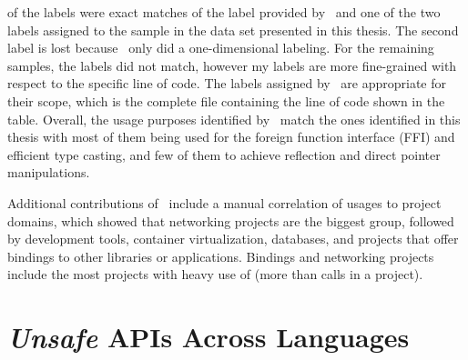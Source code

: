 

 of the labels were exact matches of the label provided by~\cite{costa2020} and one of the two labels
assigned to the sample in the data set presented in this thesis.
The second label is lost because~\cite{costa2020} only did a one-dimensional labeling.
For the remaining  samples, the labels did not match, however my labels are more fine-grained with respect
to the specific line of code.
The labels assigned by~\cite{costa2020} are appropriate for their scope, which is the complete file containing the line
of code shown in the table.
Overall, the usage purposes identified by~\cite{costa2020} match the ones identified in this thesis with most of them
being used for the foreign function interface (\acrshort{FFI}) and efficient type casting, and few of them to achieve
reflection and direct pointer manipulations.

Additional contributions of~\cite{costa2020} include a manual correlation of \unsafe{} usages to project domains, which
showed that networking projects are the biggest group, followed by development tools, container virtualization,
databases, and projects that offer bindings to other libraries or applications.
Bindings and networking projects include the most projects with heavy use of \unsafe{} (more than  calls
in a project).



\section{\textit{Unsafe} APIs Across Languages}\label{sec:related-work:unsafe-across-languages}

